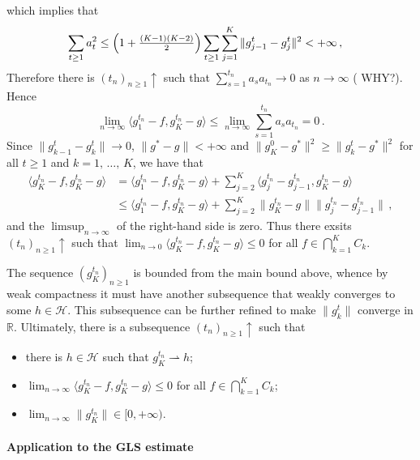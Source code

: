 \documentclass[a4paper]{article}
\newcommand{\Hcal}{\mathcal{H}}
\newcommand{\real}{\mathbb{R}}
\begin{document}
which implies that
\begin{align*}
  \sum_{t\geq 1} a^2_t
    &\leq \Bigl(1+\tfrac{(K-1)(K-2)}{2}\Bigr)
      \sum_{t\geq 1} \sum_{j=1}^K \| g^t_{j-1} - g^t_j \|^2
      < +\infty
    \,,
\end{align*}
Therefore there is $(t_n)_{n\geq1} \uparrow$ such that $\sum_{s=1}^{t_n} a_s a_{t_n}
\to 0$ as $n\longrightarrow \infty$ ({\color{red} WHY?}).
Hence
\begin{equation*}
  \lim_{n \to \infty} \langle g^{t_n}_1 - f, g^{t_n}_K - g \rangle
    \leq \lim_{n \to \infty} \sum_{s=1}^{t_n} a_s a_{t_n}
    = 0
    \,.
\end{equation*}
Since $\|g^t_{k-1} - g^t_k \| \to 0$, $\|g^*-g\|<+\infty$ and $\|g^0_K - g^*\|^2
\geq \|g^t_k - g^*\|^2$ for all $t\geq 1$ and $k=1,\,\ldots,\,K$, we have that
\begin{align*}
  \langle g^{t_n}_K - f, g^{t_n}_K - g \rangle
    &= \langle g^{t_n}_1 - f, g^{t_n}_K - g \rangle
      + \sum_{j=2}^K \langle g^{t_n}_j - g^{t_n}_{j-1}, g^{t_n}_K - g \rangle
      \\
    &\leq \langle g^{t_n}_1 - f, g^{t_n}_K - g \rangle
      + \sum_{j=2}^K \|g^{t_n}_K - g\| \|g^{t_n}_j - g^{t_n}_{j-1}\|
      \,,
\end{align*}
and the $\limsup_{n\to \infty}$ of the right-hand side is zero. Thus there exsits
$(t_n)_{n\geq1} \uparrow$ such that $\lim_{n\to 0} \langle g^{t_n}_K - f, g^{t_n}_K - g
\rangle \leq 0$ for all $f\in \bigcap_{k=1}^K C_k$.

The sequence $(g^{t_n}_K)_{n\geq 1}$ is bounded from the main bound above, whence
by weak compactness it must have another subsequence that weakly converges to some
$h\in \Hcal$. This subsequence can be further refined to make $\|g^t_k\|$ converge
in $\real$. Ultimately, there is a subsequence $(t_n)_{n\geq1}\uparrow$ such that
\begin{itemize}
  \item there is $h\in \Hcal$ such that $g^{t_n}_K \rightharpoonup h$;
  \item $\lim_{n\to \infty} \langle g^{t_n}_K - f, g^{t_n}_K - g \rangle \leq 0$
  for all $f\in \bigcap_{k=1}^K C_k$;
  \item $\lim_{n \to \infty} \|g^{t_n}_K\| \in [0, +\infty)$.
\end{itemize}

\paragraph{Application to the GLS estimate} %
\label{par:application_to_the_gls_estimate}
\end{document}

